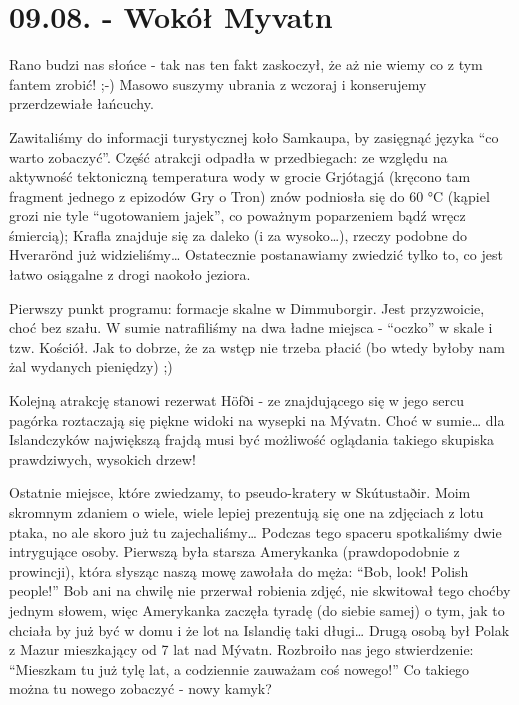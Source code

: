\chapter*{09.08. - Wokół Myvatn}

Rano budzi nas słońce - tak nas ten fakt zaskoczył, że aż nie wiemy co z tym fantem zrobić! ;-) Masowo suszymy ubrania z wczoraj i konserujemy przerdzewiałe łańcuchy.

Zawitaliśmy do informacji turystycznej koło Samkaupa, by zasięgnąć języka “co warto zobaczyć”. Część atrakcji odpadła w przedbiegach: ze względu na aktywność tektoniczną temperatura wody w grocie Grjótagjá (kręcono tam fragment jednego z epizodów Gry o Tron) znów podniosła się do 60 °C (kąpiel grozi nie tyle “ugotowaniem jajek”, co poważnym poparzeniem bądź wręcz śmiercią); Krafla znajduje się za daleko (i za wysoko…), rzeczy podobne do Hverarönd już widzieliśmy… Ostatecznie postanawiamy zwiedzić tylko to, co jest łatwo osiągalne z drogi naokoło jeziora.

Pierwszy punkt programu: formacje skalne w Dimmuborgir. Jest przyzwoicie, choć bez szału. W sumie natrafiliśmy na dwa ładne miejsca - “oczko” w skale i tzw. Kościół. Jak to dobrze, że za wstęp nie trzeba płacić (bo wtedy byłoby nam żal wydanych pieniędzy) ;)


Kolejną atrakcję stanowi rezerwat Höfði - ze znajdującego się w jego sercu pagórka roztaczają się piękne widoki na wysepki na Mývatn. Choć w sumie… dla Islandczyków największą frajdą musi być możliwość oglądania takiego skupiska prawdziwych, wysokich drzew!

Ostatnie miejsce, które zwiedzamy, to pseudo-kratery w Skútustaðir. Moim skromnym zdaniem o wiele, wiele lepiej prezentują się one na zdjęciach z lotu ptaka, no ale skoro już tu zajechaliśmy… Podczas tego spaceru spotkaliśmy dwie intrygujące osoby. Pierwszą była starsza Amerykanka (prawdopodobnie z prowincji), która słysząc naszą mowę zawołała do męża: “Bob, look! Polish people!” Bob ani na chwilę nie przerwał robienia zdjęć, nie skwitował tego choćby jednym słowem, więc Amerykanka zaczęła tyradę (do siebie samej) o tym, jak to chciała by już być w domu i że lot na Islandię taki długi… Drugą osobą był Polak z Mazur mieszkający od 7 lat nad Mývatn. Rozbroiło nas jego stwierdzenie: “Mieszkam tu już tylę lat, a codziennie zauważam coś nowego!” Co takiego można tu nowego zobaczyć - nowy kamyk?


